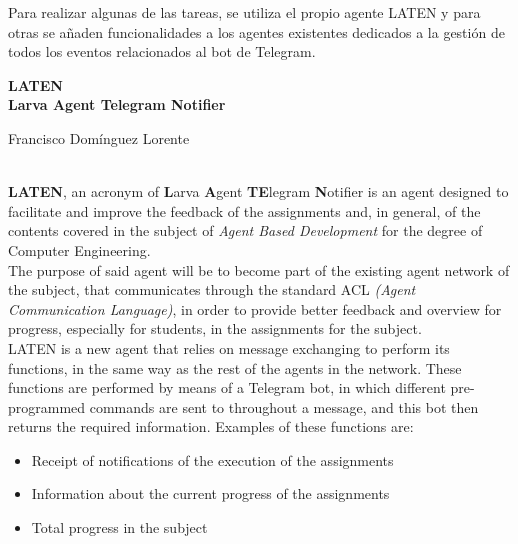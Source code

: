 	Para realizar algunas de las tareas, se utiliza el propio agente LATEN y para otras se añaden funcionalidades a los agentes existentes dedicados a la gestión de todos los eventos
	relacionados al bot de Telegram.\\

\cleardoublepage

\begin{center}
	{\large\bfseries LATEN \\ Larva Agent Telegram Notifier }\\
\end{center}
\begin{center}
	Francisco Domínguez Lorente\\
\end{center}
\vspace{0.5cm}
\vspace{0.7cm}

\\
    \textbf{LATEN}, an acronym of \textbf{L}arva \textbf{A}gent \textbf{TE}legram \textbf{N}otifier is an agent designed to facilitate and improve the feedback of the assignments and, in general, of the contents covered in the subject of \textit{Agent Based Development} for the degree of Computer Engineering.\\
    
    The purpose of said agent will be to become part of the existing agent network of the subject, that communicates through the standard ACL \textit{(Agent Communication Language)}, in order to provide better feedback and overview for progress, especially for students, in the assignments for the subject.\\
    
    LATEN is a new agent that relies on message exchanging to perform its functions, in the same way as the rest of the agents in the network. These functions are performed by means of a Telegram bot, in which different pre-programmed commands are sent to throughout a message, and this bot then returns the required information. Examples of these functions are:
    
    \begin{itemize}
		\item Receipt of notifications of the execution of the assignments
		\item Information about the current progress of the assignments
		\item Total progress in the subject
	\end{itemize}
	
